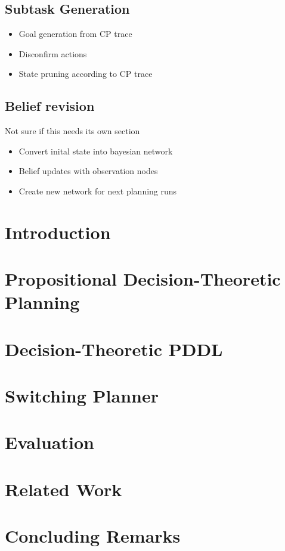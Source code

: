 \documentclass[letterpaper]{article}
\begin{document}
\subsection{Subtask Generation}
\begin{itemize}
\item Goal generation from CP trace
\item Disconfirm actions
\item State pruning according to CP trace
\end{itemize}

\subsection{Belief revision}
Not sure if this needs its own section
\begin{itemize}
\item Convert inital state into bayesian network
\item Belief updates with observation nodes
\item Create new network for next planning runs
\end{itemize}

\section{Introduction}


\section{Propositional Decision-Theoretic Planning}


\section{Decision-Theoretic PDDL}


\section{Switching Planner}


\section{Evaluation}



\section{Related Work}


\section{Concluding Remarks}





\end{document}
